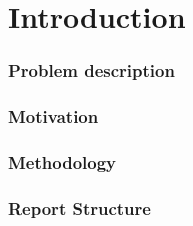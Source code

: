 
\chapter{Introduction}




\subsection{Problem description}


\subsection{Motivation}

\subsection{Methodology}

\subsection{Report Structure}